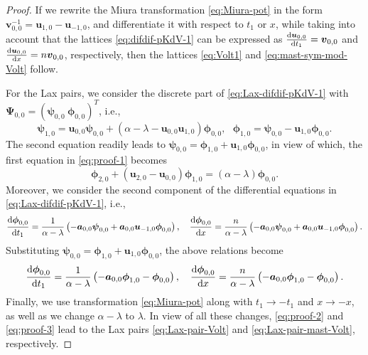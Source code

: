 \documentclass[dvips,10pt]{article}
\newcommand{\bs}{\boldsymbol}
\newcommand{\bsu}{ {\bs{u}}}
\newcommand{\bsa}{ {\bs{a}}}
\theoremstyle{remark} %
\begin{document}
	\begin{proof}
		If we rewrite the Miura transformation \eqref{eq:Miura-pot} in the form $	{\bs{v}}_{0,0}^{-1} = {\bs{u}}_{1,0} -{\bs{u}}_{-1,0}$, and differentiate it with respect to $t_1$ or $x$, while taking into account that the lattices \eqref{eq:difdif-pKdV-1} can be expressed as $\tfrac{{\rm{d}} {\bs{u}}_{0,0}}{{\rm{d}} t_1} =  {\bs{v}}_{0,0}$ and $\tfrac{{\rm{d}} {\bs{u}}_{0,0}}{{\rm{d}} x} =  n {\bs{v}}_{0,0}$, respectively, then the lattices \eqref{eq:Volt1} and \eqref{eq:mast-sym-mod-Volt} follow.	
		
		For the Lax pairs, we consider the discrete part of \eqref{eq:Lax-difdif-pKdV-1} with ${\bs{\Psi}}_{0,0} = \left( {\bs{\psi}}_{0,0} ~ {\bs{\phi}}_{0,0}\right)^T$, i.e.,
		\begin{equation} \label{eq:proof-1}
			{\bs{\psi}}_{1,0} = \bsu_{0,0} {\bs{\psi}}_{0,0} + (\alpha-\lambda - \bsu_{0,0} \bsu_{1,0}) {\bs{\phi}}_{0,0}, ~~~  
			{\bs{\phi}}_{1,0} =  {\bs{\psi}}_{0,0} -  \bsu_{1,0} {\bs{\phi}}_{0,0}.
		\end{equation} 
		The second equation readily leads to $ {\bs{\psi}}_{0,0} = {\bs{\phi}}_{1,0}+\bsu_{1,0} {\bs{\phi}}_{0,0}$, in view of which, the first equation in \eqref{eq:proof-1} becomes
		\begin{equation} \label{eq:proof-2}
			{\bs{\phi}}_{2,0}+\left(\bsu_{2,0} -\bsu_{0,0} \right) {\bs{\phi}}_{1,0}  = (\alpha-\lambda) {\bs{\phi}}_{0,0}.
		\end{equation}
		Moreover, we consider the second component of the differential equations in \eqref{eq:Lax-difdif-pKdV-1}, i.e.,
		$$\frac{{\rm{d}} {\bs{\phi}}_{0,0}}{{\rm{d}} t_1} = \frac{1}{\alpha-\lambda} \left( -\bsa_{0,0} {\bs{\psi}}_{0,0} +\bsa_{0,0} \bsu_{-1,0} {\bs{\phi}}_{0,0} \right),~~~ \frac{{\rm{d}} {\bs{\phi}}_{0,0}}{{\rm{d}} x} = \frac{n}{\alpha-\lambda} \left( -\bsa_{0,0} {\bs{\psi}}_{0,0} +\bsa_{0,0} \bsu_{-1,0} {\bs{\phi}}_{0,0} \right).$$
		Substituting $ {\bs{\psi}}_{0,0} = {\bs{\phi}}_{1,0}+\bsu_{1,0} {\bs{\phi}}_{0,0}$, the above relations become
		\begin{equation} \label{eq:proof-3}
			\frac{{\rm{d}} {\bs{\phi}}_{0,0}}{{\rm{d}} t_1} = \frac{1}{\alpha-\lambda} \left( -\bsa_{0,0} {\bs{\phi}}_{1,0} - {\bs{\phi}}_{0,0} \right),~~~ \frac{{\rm{d}} {\bs{\phi}}_{0,0}}{{\rm{d}} x} = \frac{n}{\alpha-\lambda} \left(-\bsa_{0,0} {\bs{\phi}}_{1,0} - {\bs{\phi}}_{0,0}  \right).
		\end{equation}
		Finally, we use transformation \eqref{eq:Miura-pot} along with $t_1 \rightarrow -t_1$ and $x \rightarrow -x$, as well as we change $\alpha-\lambda$ to $\lambda$. In view of all these changes, \eqref{eq:proof-2} and \eqref{eq:proof-3} lead to the Lax pairs \eqref{eq:Lax-pair-Volt} and \eqref{eq:Lax-pair-mast-Volt}, respectively. 
	\end{proof}
	
\end{document}
